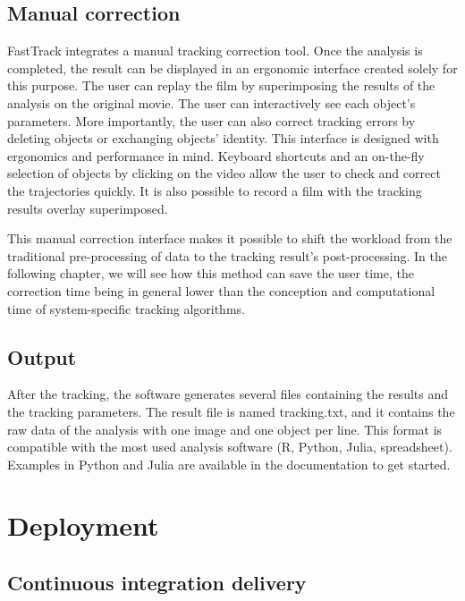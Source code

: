     \subsection{Manual correction}
    FastTrack integrates a manual tracking correction tool. Once the analysis is completed, the result can be displayed in an ergonomic interface created solely for this purpose. The user can replay the film by superimposing the results of the analysis on the original movie. The user can interactively see each object's parameters. More importantly, the user can also correct tracking errors by deleting objects or exchanging objects' identity.
    This interface is designed with ergonomics and performance in mind. Keyboard shortcuts and an on-the-fly selection of objects by clicking on the video allow the user to check and correct the trajectories quickly. It is also possible to record a film with the tracking results overlay superimposed.

    This manual correction interface makes it possible to shift the workload from the traditional pre-processing of data to the tracking result's post-processing. In the following chapter, we will see how this method can save the user time, the correction time being in general lower than the conception and computational time of system-specific tracking algorithms.

    \subsection{Output}
    After the tracking, the software generates several files containing the results and the tracking parameters. The result file is named tracking.txt, and it contains the raw data of the analysis with one image and one object per line. This format is compatible with the most used analysis software (R, Python, Julia, spreadsheet). Examples in Python and Julia are available in the documentation to get started.

	\section{Deployment}
    \subsection{Continuous integration delivery}
    \label{part_1:cicd}

